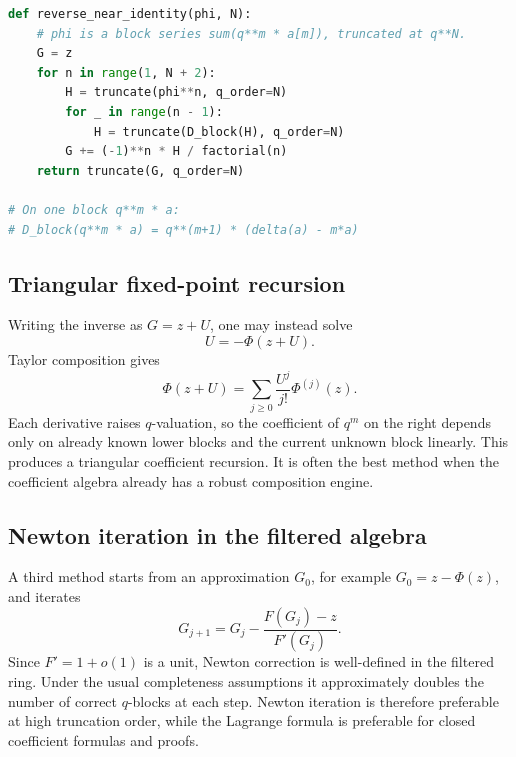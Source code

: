 \documentclass[11pt]{article}
\theoremstyle{clean}
\begin{document}
\begin{lstlisting}[language=Python,caption={Filtered Lagrange reversal.}]
def reverse_near_identity(phi, N):
    # phi is a block series sum(q**m * a[m]), truncated at q**N.
    G = z
    for n in range(1, N + 2):
        H = truncate(phi**n, q_order=N)
        for _ in range(n - 1):
            H = truncate(D_block(H), q_order=N)
        G += (-1)**n * H / factorial(n)
    return truncate(G, q_order=N)

# On one block q**m * a:
# D_block(q**m * a) = q**(m+1) * (delta(a) - m*a)
\end{lstlisting}

\subsection{Triangular fixed-point recursion}

Writing the inverse as \(G=z+U\), one may instead solve
\begin{equation}\label{eq:fixedpointU}
  U=-\Phi(z+U).
\end{equation}
Taylor composition gives
\begin{equation}\label{eq:TaylorPhi}
  \Phi(z+U)=\sum_{j\ge0}\frac{U^j}{j!}\Phi^{(j)}(z).
\end{equation}
Each derivative raises \(q\)-valuation, so the coefficient of \(q^m\) on the
right depends only on already known lower blocks and the current unknown block
linearly.  This produces a triangular coefficient recursion.  It is often the
best method when the coefficient algebra already has a robust composition
engine.

\subsection{Newton iteration in the filtered algebra}

A third method starts from an approximation \(G_0\), for example
\(G_0=z-\Phi(z)\), and iterates
\begin{equation}\label{eq:Newtoninverse}
  G_{j+1}=G_j-
  \frac{F(G_j)-z}{F'(G_j)}.
\end{equation}
Since \(F'=1+o(1)\) is a unit, Newton correction is well-defined in the
filtered ring.  Under the usual completeness assumptions it approximately
doubles the number of correct \(q\)-blocks at each step.  Newton iteration is
therefore preferable at high truncation order, while the Lagrange formula is
preferable for closed coefficient formulas and proofs.
\end{document}
